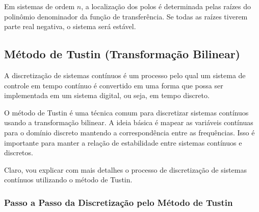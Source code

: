 \documentclass[a4paper,12pt]{article}
\begin{document}
Em sistemas de ordem \(n\), a localização dos polos é determinada pelas raízes do polinômio denominador da função de transferência. Se todas as raízes tiverem parte real negativa, o sistema será estável.

\subsection{Método de Tustin (Transformação Bilinear)}

A discretização de sistemas contínuos é um processo pelo qual um sistema de controle em tempo contínuo é convertido em uma forma que possa ser implementada em um sistema digital, ou seja, em tempo discreto.

O método de Tustin é uma técnica comum para discretizar sistemas contínuos usando a transformação bilinear. A ideia básica é mapear as variáveis contínuas para o domínio discreto mantendo a correspondência entre as frequências. Isso é importante para manter a relação de estabilidade entre sistemas contínuos e discretos.

Claro, vou explicar com mais detalhes o processo de discretização de sistemas contínuos utilizando o método de Tustin.

\subsubsection{Passo a Passo da Discretização pelo Método de Tustin}
\end{document}
